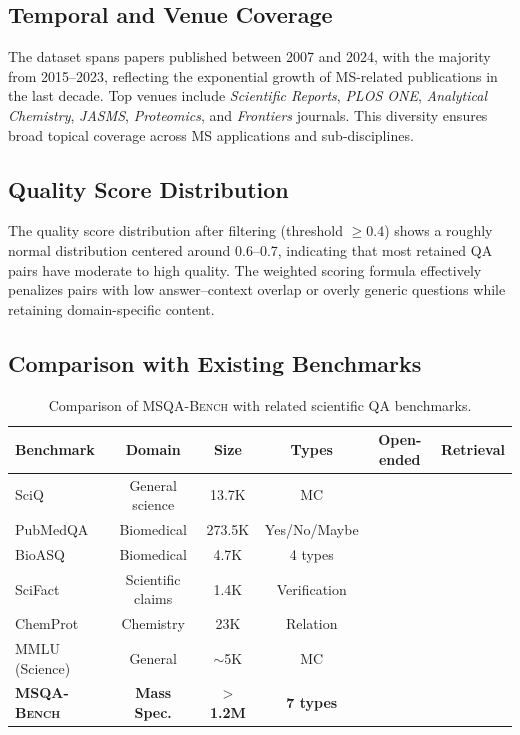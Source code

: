 \documentclass[11pt]{article}
\newcommand{\msqa}{\textsc{MSQA-Bench}}
\newcommand{\cmark}{\ding{51}}
\newcommand{\xmark}{\ding{55}}
\begin{document}
\subsection{Temporal and Venue Coverage}

The dataset spans papers published between 2007 and 2024, with the majority from 2015--2023, reflecting the exponential growth of MS-related publications in the last decade. Top venues include \textit{Scientific Reports}, \textit{PLOS ONE}, \textit{Analytical Chemistry}, \textit{JASMS}, \textit{Proteomics}, and \textit{Frontiers} journals. This diversity ensures broad topical coverage across MS applications and sub-disciplines.

\subsection{Quality Score Distribution}

The quality score distribution after filtering (threshold $\geq 0.4$) shows a roughly normal distribution centered around 0.6--0.7, indicating that most retained QA pairs have moderate to high quality. The weighted scoring formula effectively penalizes pairs with low answer--context overlap or overly generic questions while retaining domain-specific content.

\subsection{Comparison with Existing Benchmarks}

\begin{table}[t]
\caption{Comparison of \msqa{} with related scientific QA benchmarks.}
\label{tab:comparison}
\centering
\small
\begin{tabular}{lccccc}
\toprule
\textbf{Benchmark} & \textbf{Domain} & \textbf{Size} & \textbf{Types} & \textbf{Open-ended} & \textbf{Retrieval} \\
\midrule
SciQ & General science & 13.7K & MC & \xmark & \xmark \\
PubMedQA & Biomedical & 273.5K & Yes/No/Maybe & \xmark & \xmark \\
BioASQ & Biomedical & 4.7K & 4 types & \cmark & \cmark \\
SciFact & Scientific claims & 1.4K & Verification & \xmark & \cmark \\
ChemProt & Chemistry & 23K & Relation & \xmark & \xmark \\
MMLU (Science) & General & $\sim$5K & MC & \xmark & \xmark \\
\midrule
\textbf{\msqa{}} & \textbf{Mass Spec.} & \textbf{$>$1.2M} & \textbf{7 types} & \textbf{\cmark} & \textbf{\cmark} \\
\bottomrule
\end{tabular}
\end{table}
\end{document}
